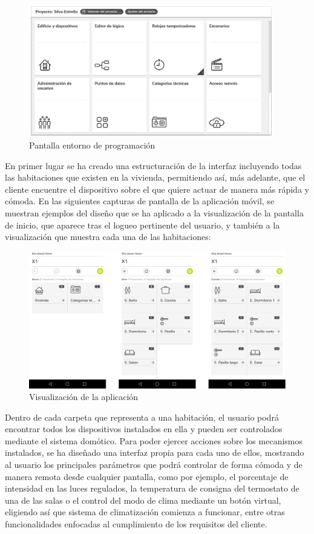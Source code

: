 \begin{figure}[H]
\centering
\includegraphics[width=0.95\textwidth]{figures/prog_x1_1.png}   
\caption{Pantalla entorno de programación}
\label{fig:prog_x1_1}
\end{figure}
\vspace{1.5cm}
En primer lugar se ha creado una estructuración de la interfaz incluyendo todas las habitaciones que existen en la vivienda, permitiendo así, más adelante, que el cliente encuentre el dispositivo sobre el que quiere actuar de manera más rápida y cómoda. En las siguientes capturas de pantalla de la aplicación móvil, se muestran ejemplos del diseño que se ha aplicado a la visualización de la pantalla de inicio, que aparece tras el logueo pertinente del usuario, y también a la visualización que muestra cada una de las habitaciones:  
\begin{figure}[H]
\centering
\includegraphics[width=1.00\textwidth]{figures/prog_x1_3.png}   
\caption{Visualización de la aplicación}
\label{fig:prog_x1_3}
\end{figure}
Dentro de cada carpeta que representa a una habitación, el usuario podrá encontrar todos los dispositivos instalados en ella y pueden ser controlados mediante el sistema domótico. Para poder ejercer acciones sobre los mecanismos instalados, se ha diseñado una interfaz propia para cada uno de ellos, mostrando al usuario los principales parámetros que podrá controlar de forma cómoda y de manera remota desde cualquier pantalla, como por ejemplo, el porcentaje de intensidad en las luces regulados, la temperatura de consigna del termostato de una de las salas o el control del modo de clima mediante un botón virtual, eligiendo así que sistema de climatización comienza a funcionar, entre otras funcionalidades enfocadas al cumplimiento de los requisitos del cliente. 
